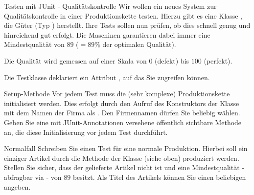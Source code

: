 \documentclass{../tuda-exercise}
\begin{document}
  \clearpage

  \begin{task}[credit=\stars{2}{3}]{Testen mit JUnit - Qualitätskontrolle}
    Wir wollen ein neues System zur Qualitätskontrolle in einer Produktionskette testen. Hierzu
    gibt es eine Klasse
    , die Güter (Typ ) herstellt. Ihre
    Tests sollen nun prüfen, ob dies schnell genug und hinreichend gut erfolgt. Die Maschinen
    garantieren dabei immer eine Mindestqualität von \(89\) (\(= 89\%\) der optimalen Qualität).

    \br

    Die Qualität wird gemessen auf einer Skala von \(0\) (defekt) bis \(100\) (perfekt).

    \br

    Die Testklasse deklariert ein Attribut , auf das
    Sie zugreifen können.

    \begin{subtask*}{Setup-Methode}
      Vor jedem Test muss die (sehr komplexe) Produktionskette initialisiert werden. Dies erfolgt
      durch den Aufruf des Konstruktors der Klasse  mit dem
      Namen der Firma als . Den Firmennamen dürfen Sie beliebig wählen. Geben
      Sie eine mit JUnit-Annotationen versehene öffentlich sichtbare Methode an, die diese
      Initialisierung vor jedem Test durchführt.

      \begin{solution}
        
      \end{solution}
    \end{subtask*}

    \begin{subtask*}{Normalfall}
      Schreiben Sie einen Test für eine normale Produktion. Hierbei soll ein einziger Artikel
       durch die Methode   der Klasse  (siehe oben) produziert werden.
      Stellen Sie sicher, dass der gelieferte Artikel nicht  ist und eine
      Mindestqualität - abfragbar via  - von \(89\) besitzt. Als Titel
      des Artikels können Sie einen beliebigen  angeben.

      \begin{solution}
        
      \end{solution}
    \end{subtask*}


\end{task}
\end{document}

